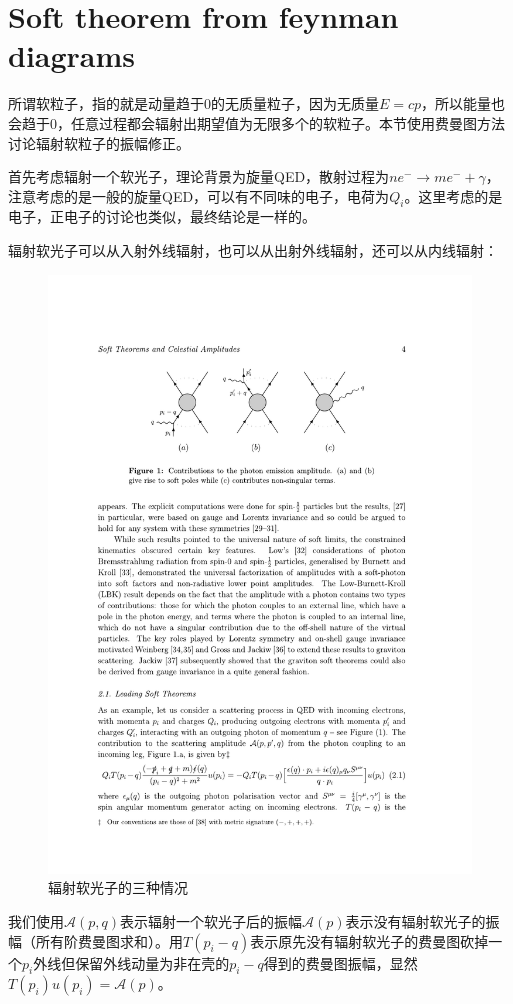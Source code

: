 \section{Soft theorem from feynman diagrams}
所谓软粒子，指的就是动量趋于0的无质量粒子，因为无质量$E=cp$，所以能量也会趋于0，任意过程都会辐射出期望值为无限多个的软粒子。本节使用费曼图方法讨论辐射软粒子的振幅修正\cite{McLoughlin:2022ljp}。

首先考虑辐射一个软光子，理论背景为旋量QED，散射过程为$ne^-\to me^-+\gamma $，注意考虑的是一般的旋量QED，可以有不同味的电子，电荷为$Q_i$。这里考虑的是电子，正电子的讨论也类似，最终结论是一样的。

辐射软光子可以从入射外线辐射，也可以从出射外线辐射，还可以从内线辐射：
\begin{figure}[H]
	\centering
	\includegraphics[width=0.8\linewidth]{figs/fig3.pdf}
	\caption{辐射软光子的三种情况}
\end{figure}
我们使用$\mathcal{A}(p,q)$表示辐射一个软光子后的振幅$\mathcal{A}(p)$表示没有辐射软光子的振幅（所有阶费曼图求和）。用$T(p_i-q)$表示原先没有辐射软光子的费曼图砍掉一个$p_i$外线但保留外线动量为非在壳的$p_i-q$得到的费曼图振幅，显然$T(p_i)u(p_i)=\mathcal{A}(p)$。


